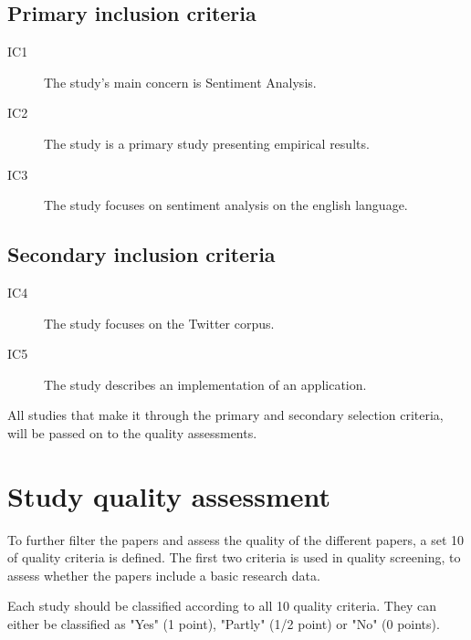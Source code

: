 \subsection{Primary inclusion criteria}

\begin{description}

\item[IC1] The study’s main concern is Sentiment Analysis.
\item[IC2] The study is a primary study presenting empirical results.
\item[IC3] The study focuses on sentiment analysis on the english language.

\end{description}

\subsection{Secondary inclusion criteria}

\begin{description}


\item[IC4] The study focuses on the Twitter corpus.
\item[IC5] The study describes an implementation of an application.

\end{description}

All studies that make it through the primary and secondary selection criteria, will be passed on to the quality assessments. 

\section{Study quality assessment}

To further filter the papers and assess the quality of the different papers, a set 10 of quality criteria is defined. The first two criteria is used in quality screening, to assess whether the papers include a basic research data.

Each study should be classified according to all 10 quality criteria. They can either be classified as "Yes" (1 point), "Partly" (1/2 point) or "No" (0 points).

